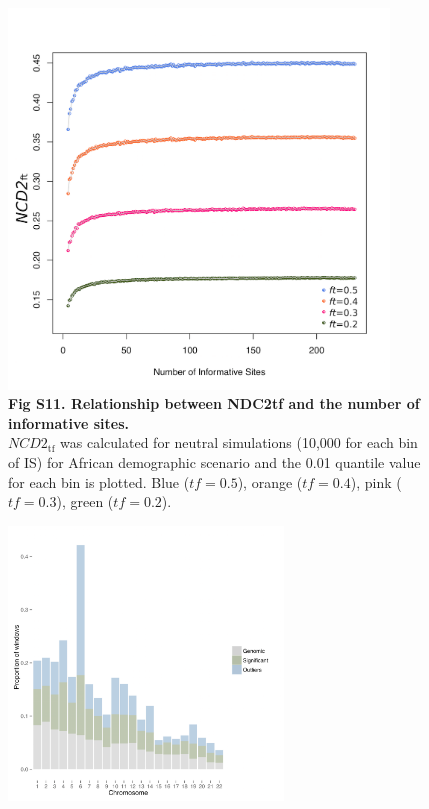 \begin{refsection}
\begin{otherlanguage}{english}
\begin{figure}[h]
\centering
\includegraphics[width=0.9\textwidth, keepaspectratio]{chap2_folder/supp_figures/S11_Fig.png}
\caption*{\textbf{Fig S11. Relationship between NDC2tf and the number of informative sites.}\\
$NCD2_{\mathrm{tf}}$ was calculated for neutral simulations (10,000 for each bin of IS) for African demographic scenario and the 0.01 quantile value for each bin is plotted. Blue ($tf=0.5$), orange ($tf=0.4$), pink ($tf=0.3$), green ($tf=0.2$).
}
\end{figure}
%
\begin{figure}[h]
\centering
\includegraphics[width=0.65\textwidth, keepaspectratio]{chap2_folder/supp_figures/S12_Fig.png}

\end{figure}
\end{otherlanguage}
\end{refsection}
